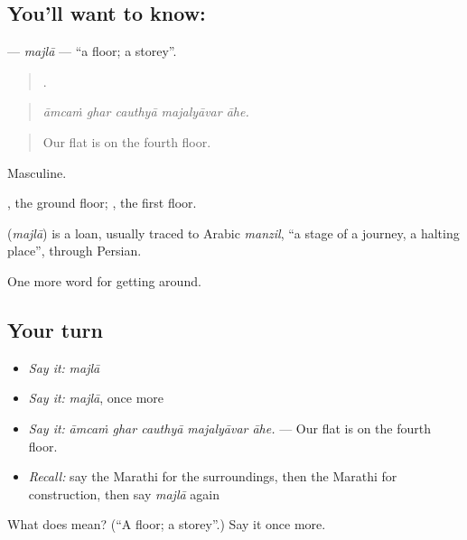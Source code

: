 \subsection*{You'll want to know: }
\textbf{} — \emph{majlā} — \textquotedblleft{}a floor; a storey\textquotedblright{}.

\begin{quote}
    .
\end{quote}

\begin{quote}
\emph{āmcaṁ ghar cauthyā majalyāvar āhe.}
\end{quote}

\begin{quote}
Our flat is on the fourth floor.
\end{quote}

Masculine.

, the ground floor;  , the first floor.

\begin{cousinweb}
\textbf{} (\emph{majlā}) is a loan, usually traced to Arabic \emph{manzil}, \textquotedblleft{}a stage of a journey, a halting place\textquotedblright{}, through Persian.
\end{cousinweb}

\begin{grammarlens}[title={What you've built}]
One more word for getting around.
\end{grammarlens}

\subsection*{Your turn}
\begin{itemize}
\raggedright
  \item \emph{Say it:} \emph{majlā}
  \item \emph{Say it:} \emph{majlā}, once more
  \item \emph{Say it:} \emph{āmcaṁ ghar cauthyā majalyāvar āhe.} — Our flat is on the fourth floor.
  \item \emph{Recall:} say the Marathi for the surroundings, then the Marathi for construction, then say \emph{majlā} again
\end{itemize}

\begin{tcolorbox}[breakable,colback=teal!4,colframe=teal!35!black,title={Before you move on}]
What does  mean? (\textquotedblleft{}A floor; a storey\textquotedblright{}.) Say it once more.
\end{tcolorbox}
